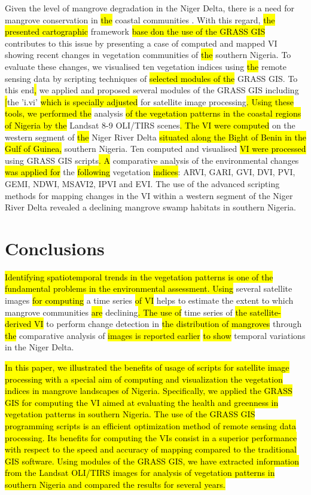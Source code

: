 \documentclass[jmse,article,submit,pdftex,moreauthors]{Definitions/mdpi}
\begin{document}
Given the level of mangrove degradation in the Niger Delta, there is a need for mangrove conservation in \hl{the }coastal communities \cite{ONYENA2020e00961}. With this regard, \hl{the presented cartographic} framework \hl{base don the use of the GRASS GIS }contributes to this issue by presenting a case of computed and mapped VI showing recent changes in vegetation communities of \hl{the }southern Nigeria. To evaluate these changes, we visualised ten vegetation indices using \hl{the }remote sensing data by scripting techniques of \hl{selected modules of the }GRASS GIS. To this end\hl{, }we\hl{ }applied and proposed several modules of the GRASS GIS including \hl[{the} 'i.vi' \hl{which is specially adjusted }for satellite image processing\hl{. Using these tools, we performed the }analysis \hl{of the vegetation patterns in the coastal regions of Nigeria by the }Landsat 8-9 OLI/TIRS scenes\hl{. The VI were computed }on the western segment of \hl{the }Niger River Delta \hl{situated along the Bight of Benin in the Gulf of Guinea,} southern Nigeria. Ten\hl{ }computed and visualised \hl{VI were processed }using GRASS GIS scripts\hl{. A }comparative analysis of the environmental changes \hl{was applied for } the \hl{following }vegetation \hl{indices}: ARVI, GARI, GVI, DVI, PVI, GEMI, NDWI, MSAVI2, IPVI and EVI. The use of the advanced scripting methods for mapping changes in the VI within a western segment of the Niger River Delta revealed a declining mangrove swamp habitats in southern Nigeria. 

\section{Conclusions}

\hl{Identifying spatiotemporal trends in the vegetation patterns is one of the fundamental problems in the environmental assessment. Using} several satellite images \hl{for computing} a time series \hl{of VI }helps to estimate the extent to which\hl{ }mangrove communities \hl{are }declining\hl{. The use of }time series of \hl{the satellite-derived VI }to perform change detection in \hl{the distribution of mangroves }through \hl{the }comparative analysis of \hl{images is reported earlier} \hl{to show} temporal variations in the\hl{ }Niger Delta.

\hl{ In this paper, we illustrated the benefits of usage of scripts for satellite image processing with a special aim of computing and visualization the vegetation indices in mangrove landscapes of Nigeria. Specifically, we applied the GRASS GIS for computing the VI aimed at evaluating the health and greenness in vegetation patterns in southern Nigeria. The use of the GRASS GIS programming scripts is an efficient optimization method of remote sensing data processing. Its benefits for computing the VIs consist in a superior performance with respect to the speed and accuracy of mapping compared to the traditional GIS software. Using modules of the GRASS GIS, we have extracted information from the Landsat OLI/TIRS images for analysis of vegetation patterns in southern Nigeria and compared the results for several years.}
\end{document}
